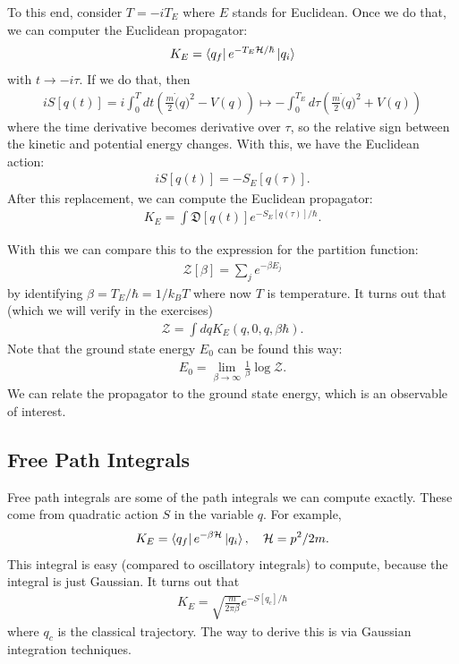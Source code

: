 \documentclass{book}
\theoremstyle{definition}
\newcommand{\had}{\mathcal{H}}
\newcommand{\f}[2]{\frac{#1}{#2}}
\newcommand{\lp}{\left(}
\newcommand{\rp}{\right)}
\begin{document}
To this end, consider $T = -i T_E$ where $E$ stands for Euclidean. Once we do that, we can computer the Euclidean propagator:
\begin{align}
K_E = \bra{q_f}  e^{-T_E \had /\hbar} \ket{q_i}
\end{align}
with $t \to -i \tau$. If we do that, then 
\begin{align}
iS[q(t)] = i\int^T_0 dt \lp \f{m}{2}\dot(q)^2  - V(q)\rp \mapsto -\int^{T_E}_0 d\tau \lp \f{m}{2}\dot(q)^2 + V(q) \rp
\end{align}
where the time derivative becomes derivative over $\tau$, so the relative sign between the kinetic and potential energy changes. With this, we have the Euclidean action:
\begin{align}
iS[q(t)] = -S_E[q(\tau)].
\end{align}
After this replacement, we can compute the Euclidean propagator:
\begin{align}
K_E = \int \mathfrak{D}[q(t)] e^{-S_E[q(\tau)] /\hbar}.
\end{align}

With this we can compare this to the expression for the partition function:
\begin{align}
\mathcal{Z}[\beta] = \sum_j e^{-\beta E_j}
\end{align}
by identifying $\beta = T_E/\hbar = 1/k_BT$ where now $T$ is temperature. It turns out that (which we will verify in the exercises)
\begin{align}
\mathcal{Z} = \int dq K_E(q,0,q,\beta\hbar).
\end{align}
Note that the ground state energy $E_0$ can be found this way:
\begin{align}
E_0 = \lim_{\beta \to \infty} \f{1}{\beta} \log \mathcal{Z}.
\end{align}
We can relate the propagator to the ground state energy, which is an observable of interest. \\



\subsection{Free Path Integrals}

Free path integrals are some of the path integrals we can compute exactly. These come from quadratic action $S$ in the variable $q$. For example,
\begin{align}
K_E = \bra{q_f}  e^{-\beta \had}  \ket{q_i}, \quad \had = p^2/2m.
\end{align}
This integral is easy (compared to oscillatory integrals) to compute, because the integral is just Gaussian. It turns out that
\begin{align}
K_E = \sqrt{\f{m}{2\pi \beta}} e^{-S[q_c]/\hbar} 
\end{align}
where $q_c$ is the classical trajectory. The way to derive this is via Gaussian integration techniques. \\
\end{document}
